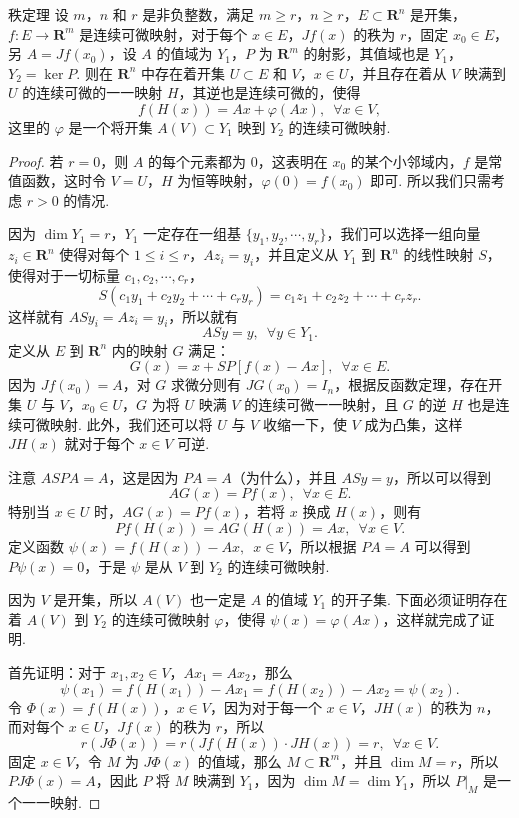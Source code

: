 \begin{theorem}{秩定理}{}
    设 $m$，$n$ 和 $r$ 是非负整数，满足 $m \geqslant r$，$n\geqslant r$，$E \subset \mathbf{R}^n$ 是开集，$f \colon E \to \mathbf{R}^m$ 是连续可微映射，对于每个 $x\in E$，$Jf(x)$ 的秩为 $r$，固定 $x_0\in E$，另 $A = Jf(x_0)$，设 $A$ 的值域为 $Y_1$，$P$ 为 $\mathbf{R}^m$ 的射影，其值域也是 $Y_1$，$Y_2 = \ker P$. 则在 $\mathbf{R}^n$ 中存在着开集 $U\subset E$ 和 $V$，$x \in U$，并且存在着从 $V$ 映满到 $U$ 的连续可微的一一映射 $H$，其逆也是连续可微的，使得 \[f(H(x)) = Ax + \varphi(Ax), \enspace \forall x\in V,\]
    这里的 $\varphi$ 是一个将开集 $A(V)\subset Y_1$ 映到 $Y_2$ 的连续可微映射.
\end{theorem}

\begin{proof}
    若 $r = 0$，则 $A$ 的每个元素都为 $0$，这表明在 $x_0$ 的某个小邻域内，$f$ 是常值函数，这时令 $V = U$，$H$ 为恒等映射，$\varphi(0) = f(x_0)$ 即可. 所以我们只需考虑 $r > 0$ 的情况.

    因为 $\dim Y_1 = r$，$Y_1$ 一定存在一组基 $\{y_1, y_2, \cdots, y_r\}$，我们可以选择一组向量 $z_i\in \mathbf{R}^n$ 使得对每个 $1 \leqslant i \leqslant r$，$Az_i = y_i$，并且定义从 $Y_1$ 到 $\mathbf{R}^n$ 的线性映射 $S$，使得对于一切标量 $c_1, c_2, \cdots, c_r$，\[S(c_1y_1 + c_2y_2 + \cdots + c_ry_r) = c_1z_1 + c_2z_2 + \cdots + c_rz_r.\]
    这样就有 $ASy_i = Az_i = y_i$，所以就有 \[ASy = y, \enspace \forall y\in Y_1.\]
    定义从 $E$ 到 $\mathbf{R}^n$ 内的映射 $G$ 满足：\[G(x) = x + SP[f(x) - Ax], \enspace \forall x\in E.\]
    因为 $Jf(x_0) = A$，对 $G$ 求微分则有 $JG(x_0) = I_n$，根据反函数定理，存在开集 $U$ 与 $V$，$x_0\in U$，$G$ 为将 $U$ 映满 $V$ 的连续可微一一映射，且 $G$ 的逆 $H$ 也是连续可微映射. 此外，我们还可以将 $U$ 与 $V$ 收缩一下，使 $V$ 成为凸集，这样 $JH(x)$ 就对于每个 $x\in V$ 可逆.

    注意 $ASPA = A$，这是因为 $PA = A$（为什么），并且 $ASy = y$，所以可以得到 \[AG(x) = Pf(x), \enspace \forall x\in E.\]
    特别当 $x\in U$ 时，$AG(x) = Pf(x)$，若将 $x$ 换成 $H(x)$，则有 \[Pf(H(x)) = AG(H(x)) = Ax, \enspace \forall x\in V.\]
    定义函数 $\psi(x) = f(H(x)) - Ax, \enspace x\in V$，所以根据 $PA = A$ 可以得到 $P\psi(x) = 0$，于是 $\psi$ 是从 $V$ 到 $Y_2$ 的连续可微映射.

    因为 $V$ 是开集，所以 $A(V)$ 也一定是 $A$ 的值域 $Y_1$ 的开子集. 下面必须证明存在着 $A(V)$ 到 $Y_2$ 的连续可微映射 $\varphi$，使得 $\psi(x) = \varphi(Ax)$，这样就完成了证明.

    首先证明：对于 $x_1, x_2\in V$，$Ax_1 = Ax_2$，那么 \[\psi(x_1) = f(H(x_1)) - Ax_1 = f(H(x_2)) - Ax_2 = \psi(x_2).\]
    令 $\Phi(x) = f(H(x))$，$x\in V$，因为对于每一个 $x\in V$，$JH(x)$ 的秩为 $n$，而对每个 $x\in U$，$Jf(x)$ 的秩为 $r$，所以 \[r(J\Phi(x)) = r(Jf(H(x))\cdot JH(x)) = r, \enspace \forall x \in V.\]
    固定 $x\in V$，令 $M$ 为 $J\Phi(x)$ 的值域，那么 $M\subset \mathbf{R}^m$，并且 $\dim M = r$，所以 $PJ\Phi(x) = A$，因此 $P$ 将 $M$ 映满到 $Y_1$，因为 $\dim M = \dim Y_1$，所以 $\left.P\right|_{M}$ 是一个一一映射.


\end{proof}
